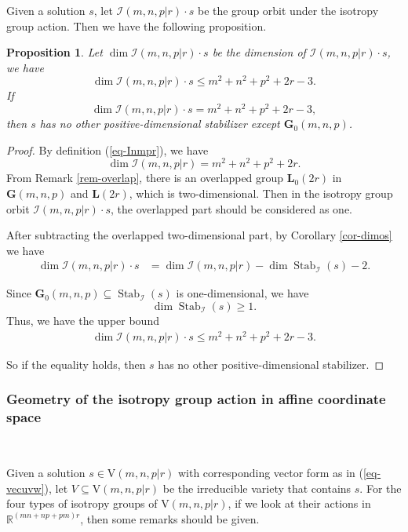 \documentclass[reqno]{amsart}
\newtheorem{proposition}[theorem]{Proposition}
\theoremstyle{definition}
\numberwithin{equation}{section}
\theoremstyle{remark}
\begin{document}
Given a solution $s$, let $\mathcal{I}(m,n,p|r)\cdot s$ be the group orbit under the isotropy group action. Then we have the following proposition.
\begin{proposition}\label{prop-dimIs}
Let $\dim \mathcal{I}(m,n,p|r)\cdot s$ be the dimension of $\mathcal{I}(m,n,p|r)\cdot s$, we have
\begin{equation*}
\dim \mathcal{I}(m,n,p|r)\cdot s \leq
m^2+n^2+p^2+2r-3.
\end{equation*}
If $$\dim \mathcal{I}(m,n,p|r)\cdot s
=m^2+n^2+p^2+2r-3,$$ then $s$ has no other positive-dimensional stabilizer except $\mathbf{G}_0(m,n,p)$.
\end{proposition}
\begin{proof}
By definition (\ref{eq-Inmpr}), we have
$$\dim \mathcal{I}(m,n,p|r)=m^2+n^2+p^2+2r.$$
From Remark \ref{rem-overlap}, there is an overlapped group $\mathbf{L}_0(2r)$ in $\mathbf{G}(m,n,p)$ and $\mathbf{L}(2r)$, which is two-dimensional. Then in the isotropy group orbit $\mathcal{I}(m,n,p|r)\cdot s$, the overlapped part should be considered as one.

After subtracting the overlapped two-dimensional part, by Corollary \ref{cor-dimos} we have 
\begin{align*}
  \dim \mathcal{I}(m,n,p|r)\cdot s &=\dim \mathcal{I}(m,n,p|r)-\dim \operatorname{Stab}_{\mathcal{I}}(s)-2.
\end{align*}

Since $\mathbf{G}_0(m,n,p)\subseteq \operatorname{Stab}_{\mathcal{I}}(s)$ is one-dimensional, we have 
$$\dim \operatorname{Stab}_{\mathcal{I}}(s)\geq1.$$
Thus, we have the upper bound
\begin{align*}
  \dim \mathcal{I}(m,n,p|r)\cdot s \leq m^2+n^2+p^2+2r-3.
\end{align*}

So if  the equality holds, then $s$ has no other positive-dimensional stabilizer.
\end{proof}



\subsubsection{Geometry of the isotropy group action in affine coordinate space}\label{subsec-geometry}
\

Given a solution $s\in \mathrm{V}(m,n,p|r)$ with corresponding vector form 
as in (\ref{eq-vecuvw}),  let $V\subseteq \mathrm{V}(m,n,p|r)$ be the irreducible variety that contains $s$.
For the four types of isotropy groups of $\mathrm{V}(m,n,p|r)$, if we look at their actions in $\mathbb{R}^{(mn+np+pm)r}$, then some remarks should be given.
\end{document}
